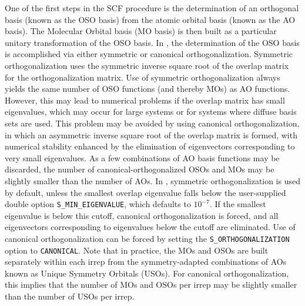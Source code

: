 One of the first steps in the SCF procedure is the determination of an
orthogonal basis (known as the OSO basis) from the atomic orbital basis (known
as the AO basis). The Molecular Orbital basis (MO basis) is then built as a
particular unitary transformation of the OSO basis. In \PSIfour, the
determination of the OSO basis is accomplished via either symmetric or
canonical orthogonalization. Symmetric orthogonalization uses the symmetric
inverse square root of the overlap matrix for the orthogonalization matrix. Use
of symmetric orthogonalization always yields the same number of OSO functions
(and thereby MOs) as AO functions. However, this may lead to numerical problems
if the overlap matrix has small eigenvalues, which may occur for large systems
or for systems where diffuse basis sets are used. This problem may be avoided by
using canonical orthogonalization, in which an asymmetric inverse square root of
the overlap matrix is formed, with numerical stability enhanced by the
elimination of eigenvectors corresponding to very small eigenvalues. As a few
combinations of AO basis functions may be discarded, the number of
canonical-orthogonalized OSOs and MOs may be slightly smaller than the number of
AOs. In \PSIfour, symmetric orthogonalization is used by default, unless the
smallest overlap eigenvalue falls below the user-supplied double option
\texttt{S\_MIN\_EIGENVALUE}, which defaults to $10^{-7}$. If the smallest
eigenvalue is below this cutoff, canonical orthogonalization is forced, and all
eigenvectors corresponding to eigenvalues below the cutoff are eliminated.
Use of canonical orthogonalization can be forced by setting the
\texttt{S\_ORTHOGONALIZATION} option to \texttt{CANONICAL}. Note that in
practice, the MOs and OSOs are built separately within each irrep from the
symmetry-adapted combinations of AOs known as Unique Symmetry Orbitals (USOs).
For canonical orthogonalization, this implies that the number of MOs and OSOs
per irrep may be slightly smaller than the number of USOs per irrep.

